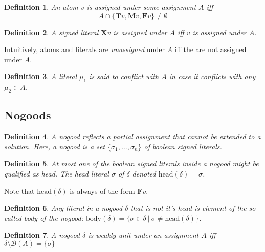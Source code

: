 \documentclass{vutinfth} %
\newtheorem{definition}{Definition}[section]
\newcommand{\bass}{\mathcal{B}}
\newcommand{\ass}{A}
\newcommand{\bT}{\mathbf{T}}
\newcommand{\bM}{\mathbf{M}}
\newcommand{\bF}{\mathbf{F}}
\newcommand{\bX}{\mathbf{X}}
\newcommand{\headf}{\mathrm{head}}
\newcommand{\bodyf}{\mathrm{body}}
\newcommand{\sgl}{\mu}
\newcommand{\bsgl}{\sigma}
\begin{document}
\begin{definition}
An atom $v$ is \emph{assigned} under some assignment $\ass$ iff $$\ass \cap \{\bT v, \bM v, \bF v \} \not = \emptyset$$
\end{definition}


\begin{definition}
A signed literal $\bX v$ is \emph{assigned} under $\ass$ iff $v$ is assigned under $\ass$.
\end{definition}

Intuitively, atoms and literals are \emph{unassigned} under $\ass$ iff the are not assigned under $\ass$.

\begin{definition}
A literal $\sgl_1$ is said to conflict with $\ass$ in case it conflicts with any $\sgl_2 \in \ass$.
\end{definition}

\subsection{Nogoods}

\begin{definition}
A \emph{nogood} reflects a partial assignment that cannot be extended to a solution. Here, a \emph{nogood} is a set $\{ \bsgl_1, \ldots, \bsgl_n \}$ of boolean signed literals.
\end{definition}

\begin{definition}
At most one of the boolean signed literals inside a nogood might be qualified as head. The head literal $\bsgl$ of $\delta$ denoted $\headf(\delta) = \bsgl$.
\end{definition}

Note that $\headf(\delta)$ is always of the form $\bF v$. %

\begin{definition}
Any literal in a nogood $\delta$ that is not it's head is element of the so called \emph{body} of the nogood: $\bodyf(\delta) = \{ \bsgl \in \delta \ | \ \bsgl \not = \headf(\delta) \}$.
\end{definition}

\begin{definition}
A nogood $\delta$ is \emph{weakly unit} under an assignment $\ass$ iff $\delta \setminus \bass(\ass) = \{ \bsgl \}$
\end{definition}
\end{document}
